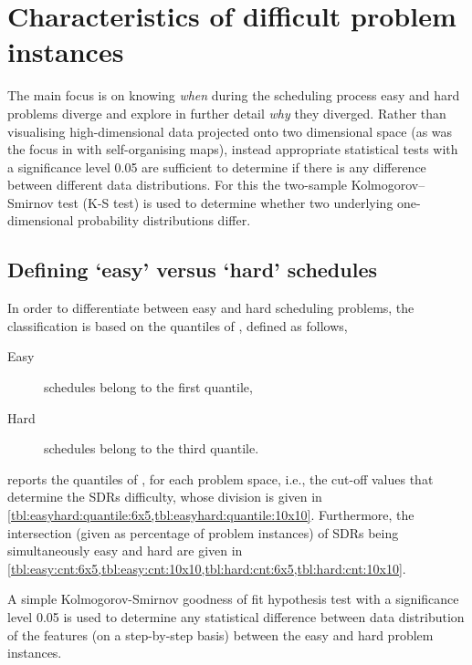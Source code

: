 \section{Characteristics of difficult problem instances}

The main focus is on knowing \emph{when} during the scheduling process easy and hard problems diverge and explore in further detail \emph{why} they diverged. Rather than visualising high-dimensional data projected onto two dimensional space (as was the focus in \cite{SmithMilesLion5} with self-organising maps), instead appropriate statistical tests with a significance level 0.05 are sufficient to determine if there is any difference between different data distributions. For this the two-sample Kolmogorov–Smirnov test (K-S test) is used to determine whether two underlying one-dimensional probability distributions differ. 

\subsection{Defining `easy' versus `hard' schedules}
In order to differentiate between easy and hard scheduling problems, the classification is based on the quantiles of \namerho, defined as follows, 
\begin{description}
\item[Easy] schedules belong to the first quantile, 
\item[Hard] schedules belong to the third quantile.
\end{description}
 reports the quantiles of \namerho, for each problem space, i.e., the cut-off values that determine the SDRs difficulty, whose division is given in \cref{tbl:easyhard:quantile:6x5,tbl:easyhard:quantile:10x10}. Furthermore, the intersection (given as percentage of problem instances) of SDRs being simultaneously easy and hard are given in \cref{tbl:easy:cnt:6x5,tbl:easy:cnt:10x10,tbl:hard:cnt:6x5,tbl:hard:cnt:10x10}.

A simple Kolmogorov-Smirnov goodness of fit hypothesis test with a significance level 0.05 is used to determine any statistical difference between data distribution of the features (on a step-by-step basis) between the easy and hard problem instances.

